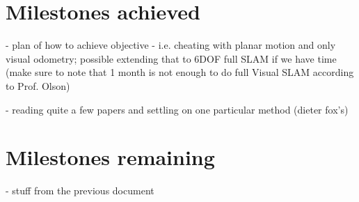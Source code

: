 \documentclass[12pt]{article}
\begin{document}
\section{Milestones achieved}
- plan of how to achieve objective - i.e. cheating with planar motion and only visual odometry; possible extending that to 6DOF full SLAM if we have time (make sure to note that 1 month is not enough to do full Visual SLAM according to Prof. Olson)

- reading quite a few papers and settling on one particular method (dieter fox's)

\section{Milestones remaining}
- stuff from the previous document
\end{document}
